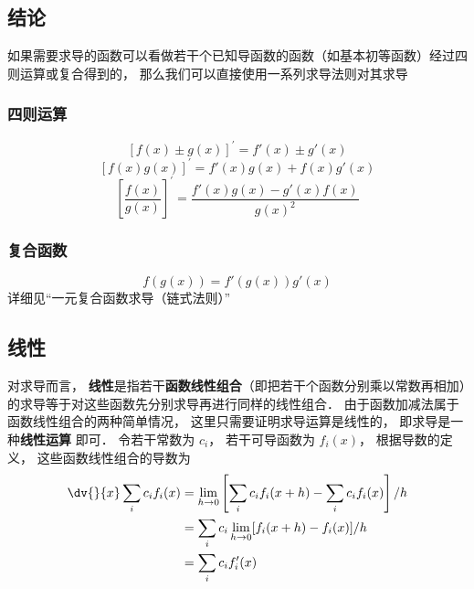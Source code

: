 \subsection{结论}
如果需要求导的函数可以看做若干个已知导函数的函数（如基本初等函数）经过四则运算或复合得到的， 那么我们可以直接使用一系列求导法则对其求导
\subsubsection{四则运算}
\begin{equation}
{\left[ {f\left( x \right) \pm g\left( x \right)} \right]^\prime } = f'\left( x \right) \pm g'\left( x \right)
\end{equation}
\begin{equation}
{\left[ {f\left( x \right)g\left( x \right)} \right]^\prime } = f'\left( x \right)g\left( x \right) + f\left( x \right)g'\left( x \right) 
\end{equation}
\begin{equation}
{\left[ {\frac{{f\left( x \right)}}{{g\left( x \right)}}} \right]^\prime } = \frac{{f'\left( x \right)g\left( x \right) - g'\left( x \right)f\left( x \right)}}{{g{{\left( x \right)}^2}}}
\end{equation}
\subsubsection{复合函数}
\begin{equation}
f\left( {g\left( x \right)} \right) = f'\left( {g\left( x \right)} \right)g'\left( x \right)
\end{equation}
详细见“一元复合函数求导（链式法则）”

\subsection{线性}
对求导而言， \textbf{线性}是指若干\textbf{函数线性组合}（即把若干个函数分别乘以常数再相加）的求导等于对这些函数先分别求导再进行同样的线性组合． 由于函数加减法属于函数线性组合的两种简单情况， 这里只需要证明求导运算是线性的， 即求导是一种\textbf{线性运算} 即可．  令若干常数为 $c_i$， 若干可导函数为 $f_i(x)$， 根据导数的定义， 这些函数线性组合的导数为
\begin{equation}\begin{aligned}
\dv{}{x}\sum_i c_i f_i(x) &= \lim_{h\to 0}\left[\sum_i c_i f_i(x+h) - \sum_i c_i f_i(x)\right]/h\\
& =  \sum_i {c_i \lim_{h\to 0} [f_i(x+h) - f_i(x)]/h} \\
& = \sum_i {c_i f_i'(x)}
\end{aligned}\end{equation}

